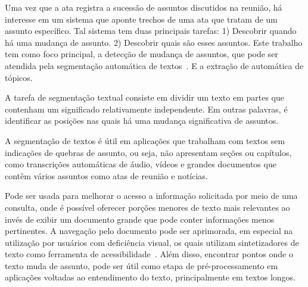 




Uma vez que a ata registra a sucessão de assuntos discutidos na reunião, há interesse em um sistema que aponte trechos de uma ata que tratam de um assunto específico. Tal sistema tem duas principais tarefas: 1) Descobrir quando há uma mudança de assunto. 2) Descobrir quais são esses assuntos. Este trabalho tem como foco principal, a detecção de mudança de assuntos, que pode ser atendida pela segmentação automática de textos~\cite{Chen2017,Naili2016,Cardoso2017}. E a extração de automática de tópicos. 



A tarefa de segmentação textual consiste em dividir um texto em partes que contenham um significado relativamente independente. Em outras palavras, é identificar as posições nas quais há uma mudança significativa de assuntos. 

A segmentação de textos é útil em aplicações que trabalham com textos sem indicações de quebras de assunto, ou seja, não apresentam seções ou capítulos, como transcrições automáticas de áudio, vídeos e grandes documentos que contêm vários assuntos como atas de reunião e notícias.


Pode ser usada para melhorar o acesso a informação solicitada por meio de uma consulta, onde é possível oferecer porções menores de texto mais relevantes ao invés de exibir um documento grande que pode conter informações menos pertinentes. 
%
%
A navegação pelo documento pode ser aprimorada, em especial na utilização por usuários com deficiência visual, os quais utilizam  sintetizadores de texto como ferramenta de acessibilidade~\cite{Choi2000}. 
%
Além disso, encontrar pontos onde o texto muda de assunto, pode ser útil como etapa de pré-processamento em aplicações voltadas ao entendimento do texto, principalmente em textos longos.






 




